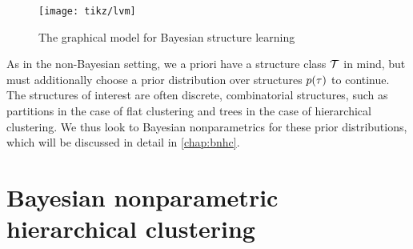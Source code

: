 \begin{figure}[t]
\centering
\texttt{[image: tikz/lvm]}
\caption{The graphical model for Bayesian structure learning}
\label{fig:structure-learning}
\end{figure}

As in the non-Bayesian setting, we a priori have a structure class
$\mathcal{T}$ in mind, but must additionally choose a prior distribution over structures $p(\tau)$ to continue. The structures of interest are often discrete, combinatorial structures, such as partitions in the case of flat clustering and trees in the case of hierarchical clustering.
We thus look to Bayesian nonparametrics for these prior distributions, which will be discussed in detail in \autoref{chap:bnhc}. 

\chapter{Bayesian nonparametric hierarchical clustering}
\label{chap:bnhc}

